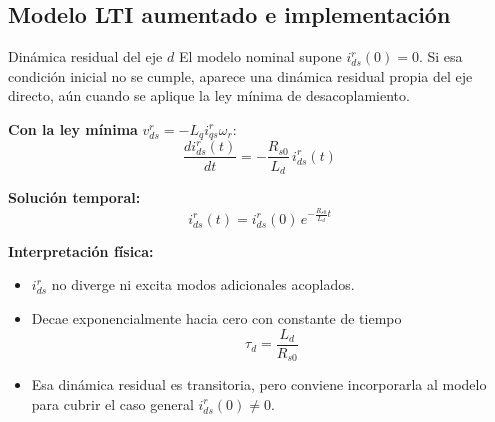 \documentclass[aspectratio=169,t]{beamer}
\begin{document}
\subsection{Modelo LTI aumentado e implementación}

\begin{frame}{Dinámica residual del eje $d$}
{\small\color{uncGray}El modelo nominal supone $i_{ds}^r(0)=0$. Si esa condición inicial no se cumple, aparece una dinámica residual propia del eje directo, aún cuando se aplique la ley mínima de desacoplamiento.}\par
\vspace{3mm}

\textbf{Con la ley mínima} $v_{ds}^{r}=-L_q i_{qs}^{r}\omega_r$:
\begin{equation*}
\frac{di_{ds}^{r}(t)}{dt}= -\frac{R_{s0}}{L_d}\,i_{ds}^{r}(t)
\end{equation*}

\textbf{Solución temporal:}
\begin{equation*}
i_{ds}^{r}(t)=i_{ds}^{r}(0)\,e^{-\frac{R_{s0}}{L_d}t}
\end{equation*}

\textbf{Interpretación física:}
\begin{itemize}
  \item $i_{ds}^{r}$ no diverge ni excita modos adicionales acoplados.
  \item Decae exponencialmente hacia cero con constante de tiempo
  \[
  \tau_d=\frac{L_d}{R_{s0}}
  \]
  \item Esa dinámica residual es transitoria, pero conviene incorporarla al modelo para cubrir el caso general $i_{ds}^r(0)\neq 0$.
\end{itemize}
\end{frame}
\end{document}
